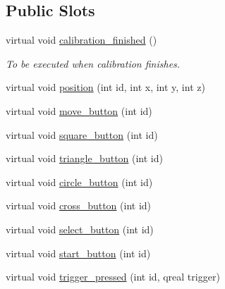 \subsection*{Public Slots}
\begin{DoxyCompactItemize}
\item 
\hypertarget{class_game_state_af9be4d918d452c0be723fb96e9c2e699}{virtual void \hyperlink{class_game_state_af9be4d918d452c0be723fb96e9c2e699}{calibration\-\_\-finished} ()}\label{class_game_state_af9be4d918d452c0be723fb96e9c2e699}

\begin{DoxyCompactList}\small\item\em To be executed when calibration finishes. \end{DoxyCompactList}\item 
virtual void \hyperlink{class_game_state_ac8f14bed66fc7a5931663ea934f75d42}{position} (int id, int x, int y, int z)
\item 
virtual void \hyperlink{class_game_state_a8ebda380d19b5800a056042e034639b9}{move\-\_\-button} (int id)
\item 
virtual void \hyperlink{class_game_state_ac34dff747a0fa09974e2996ab00fd946}{square\-\_\-button} (int id)
\item 
virtual void \hyperlink{class_game_state_a435a4bb7958616fd9fe2404b4576549e}{triangle\-\_\-button} (int id)
\item 
virtual void \hyperlink{class_game_state_ad54b4f4c9aa22eb5c90186cdc789fb8a}{circle\-\_\-button} (int id)
\item 
virtual void \hyperlink{class_game_state_a0cba4a658ac1e14f98381ba642f522a9}{cross\-\_\-button} (int id)
\item 
virtual void \hyperlink{class_game_state_a4a3f908cb9f002cfdc1b46b404cfe972}{select\-\_\-button} (int id)
\item 
virtual void \hyperlink{class_game_state_aa2708e6252ef0340930cf3234bdd51a1}{start\-\_\-button} (int id)
\item 
virtual void \hyperlink{class_game_state_a71ce465f73537005a559b429289b9fdd}{trigger\-\_\-pressed} (int id, qreal trigger)
\end{DoxyCompactItemize}
